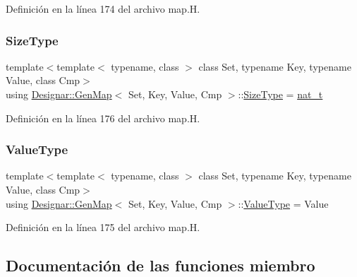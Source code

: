 Definición en la línea 174 del archivo map.\+H.

\mbox{\label{class_designar_1_1_gen_map_ad7fadcebeec688bb447f63c4bfabc61c}} 
\subsubsection{\texorpdfstring{Size\+Type}{SizeType}}
{\footnotesize\ttfamily template$<$template$<$ typename, class $>$ class Set, typename Key, typename Value, class Cmp$>$ \\
using \hyperlink{class_designar_1_1_gen_map}{Designar\+::\+Gen\+Map}$<$ Set, Key, Value, Cmp $>$\+::\hyperlink{class_designar_1_1_gen_map_ad7fadcebeec688bb447f63c4bfabc61c}{Size\+Type} =  \hyperlink{namespace_designar_aa72662848b9f4815e7bf31a7cf3e33d1}{nat\+\_\+t}}



Definición en la línea 176 del archivo map.\+H.

\mbox{\label{class_designar_1_1_gen_map_a525bf32010df09e293fa7a0db5a2a8ef}} 
\subsubsection{\texorpdfstring{Value\+Type}{ValueType}}
{\footnotesize\ttfamily template$<$template$<$ typename, class $>$ class Set, typename Key, typename Value, class Cmp$>$ \\
using \hyperlink{class_designar_1_1_gen_map}{Designar\+::\+Gen\+Map}$<$ Set, Key, Value, Cmp $>$\+::\hyperlink{class_designar_1_1_gen_map_a525bf32010df09e293fa7a0db5a2a8ef}{Value\+Type} =  Value}



Definición en la línea 175 del archivo map.\+H.



\subsection{Documentación de las funciones miembro}
\mbox{\label{class_designar_1_1_gen_map_ad5e2c8b57f6264ab98eec3a93e85b1a1}} 
